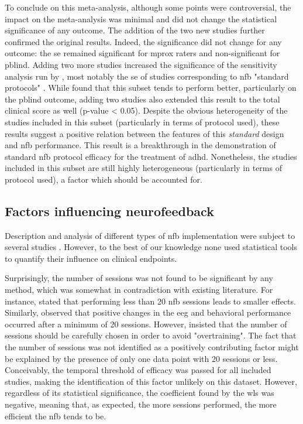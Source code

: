 To conclude on this meta-analysis, although some points were controversial, the impact on the
meta-analysis was minimal and did not change the statistical significance of any outcome. 
The addition of the two new studies \citep{Strehl2017, Baumeister2016} further confirmed the original results. Indeed, the
significance did not change for any outcome: the \gls{se} remained significant for \gls{mprox} raters and
non-significant for \gls{pblind}. Adding two more studies increased the significance of the sensitivity analysis run by
\citeauthor{Cortese2016}, most notably the \gls{se} of studies corresponding to \gls{nfb} "standard protocols" \citep{Arns2014}. 
While \citeauthor{Cortese2016} found that this subset tends to perform better, particularly on the \gls{pblind} outcome, 
adding two studies also extended this result to the total clinical score as well (p-value < 0.05). Despite the obvious heterogeneity 
of the studies included in this subset (particularly in terms of protocol used), these results suggest a positive relation 
between the features of this \emph{standard} design and \gls{nfb} performance. This result is a breakthrough in the demonstration 
of standard \gls{nfb} protocol efficacy for the treatment of \gls{adhd}. Nonetheless, the  studies 
included in this subset are still highly heterogeneous (particularly in terms of protocol used), a factor which should be accounted for.


\subsection{Factors influencing neurofeedback}

Description and analysis of different types of \gls{nfb} implementation were subject to several studies \citep{Arns2014, 
Enriquez2017, Vernon2004, Jeunet2018}. However, to the best of our knowledge none used statistical tools to quantify their influence on
clinical endpoints. 

Surprisingly, the number of sessions was not found to be significant by any method, which was somewhat
in contradiction with existing literature. For instance, \citet{Arns2014} stated that performing less than
20 \gls{nfb} sessions leads to smaller effects. Similarly, \citet{Vernon2004} observed that positive changes in the \gls{eeg}
and behavioral performance occurred after a minimum of 20 sessions. However, \citet{Enriquez2017} insisted that the number of
sessions should be carefully chosen in order to avoid "overtraining". The fact that the number of sessions was not identified as a 
positively contributing factor might be explained by the presence of only one data point with 20 sessions or less. Conceivably, 
the temporal threshold of efficacy was passed for all included studies, making the identification of this factor unlikely on 
this dataset. However, regardless of its statistical significance, the coefficient found by the \gls{wls} was negative, meaning 
that, as expected, the more sessions performed, the more efficient the \gls{nfb} tends to be. 

